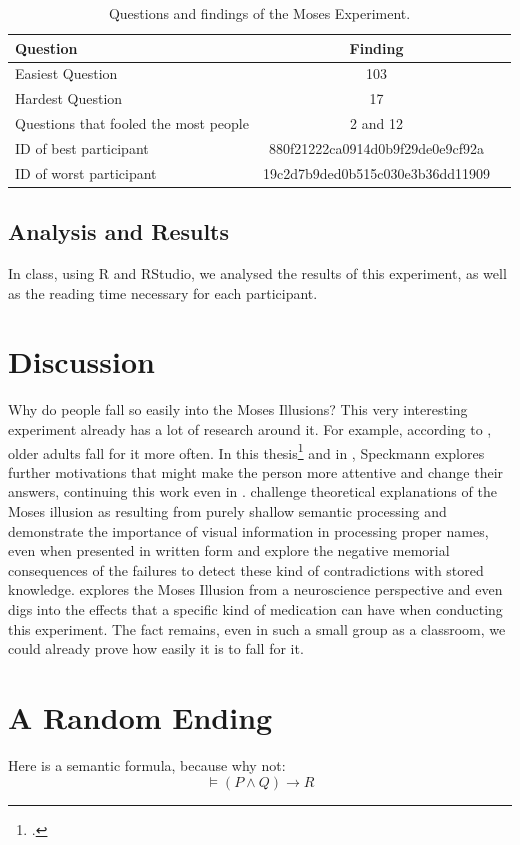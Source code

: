 \documentclass{article}
\begin{document}
\begin{table}
    \begin{tabular}{lcr}
         \textbf{Question} &\textbf{Finding} \\
         \hline
         Easiest Question &103 \\
         Hardest Question &17 \\
         Questions that fooled the most people &2 and 12 \\
         ID of best participant &880f21222ca0914d0b9f29de0e9cf92a \\
         ID of worst participant	&19c2d7b9ded0b515c030e3b36dd11909 \\
    \end{tabular}
    \caption{Questions and findings of the Moses Experiment.}\label{tab:my-label}
\end{table}

\subsection{Analysis and Results}
In class, using R and RStudio, we analysed the results of this experiment, as well as the reading time necessary for each participant.

\section{Discussion}

Why do people fall so easily into the Moses Illusions? This very interesting experiment already has a lot of research around it. For example, according to \parencite{doi:10.1080/09658211.2013.799701}, older adults fall for it more often. In this thesis\footcite{kups55556} and in , Speckmann explores further motivations that might make the person more attentive and change their answers, continuing this work even in \citeyear{inbook}. \nocite{kahneman2011thinking}
\textcite{davis2016here} challenge theoretical explanations of the Moses illusion as resulting from purely shallow semantic processing and demonstrate the importance of visual information in processing proper names, even when presented in written form and \citeauthor{bottoms2010memory} explore the negative memorial consequences of the failures to detect these kind of contradictions with stored knowledge. \cite{raposo2013contribution} explores the Moses Illusion from a neuroscience perspective and \cite{izaute2004benzodiazepines} even digs into the effects that a specific kind of medication can have when conducting this experiment.
The fact remains, even in such a small group as a classroom, we could already prove how easily it is to fall for it.


\section{A Random Ending}

Here is a semantic formula, because why not:
\[
\models (P \land Q) \rightarrow R
\]

\printbibliography
\end{document}
